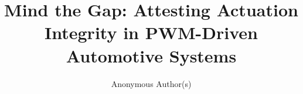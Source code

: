 \documentclass[letterpaper,twocolumn,10pt]{article}
\begin{document}
\date{}

\title{\Large \bf Mind the Gap: Attesting Actuation Integrity in PWM-Driven Automotive Systems}

\author{
{
Anonymous Author(s)
}}

\maketitle

\thispagestyle{empty}











{\footnotesize  %
}


\end{document}
